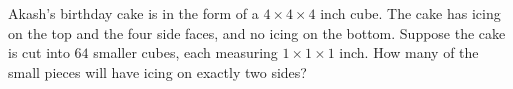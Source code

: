 Akash's birthday cake is in the form of a $4\times4\times4$ inch cube. The cake has icing on the top and the four side faces, and no icing on the bottom. Suppose the cake is cut into $64$ smaller cubes, each measuring $1\times1\times1$ inch. How many of the small pieces will have icing on exactly two sides?
